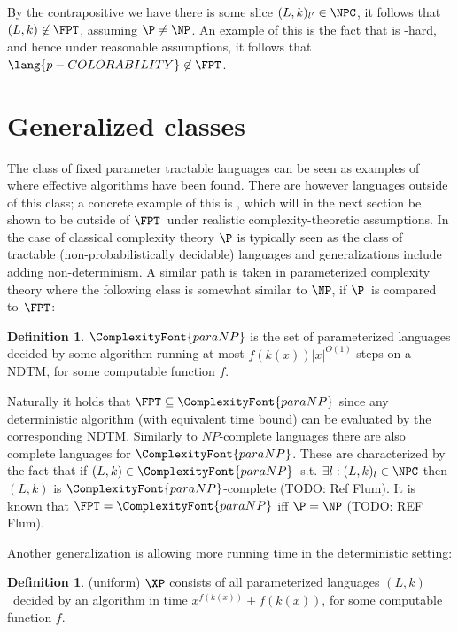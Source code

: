 \documentclass[a4paper,11pt]{report}
\theoremstyle{plain}
\theoremstyle{definition}
\newtheorem{defn}[thm]{Definition} %
\newcommand{\PARANP}{\ComplexityFont{paraNP}}
\begin{document}
By the contrapositive we have there is some slice $(L, k)_{l'} \in \NPC$, it follows that $(L, k) \not \in \FPT$, assuming $\P \not = \NP$.
An example of this is the fact that  is \NP-hard, and hence under reasonable assumptions, it follows that $\lang{p-COLORABILITY} \not \in \FPT$.

\section{Generalized classes}
The class of fixed parameter tractable languages can be seen as examples of where effective algorithms have been found.
There are however languages outside of this class; a concrete example of this is , which will in the next section be shown to be outside of $\FPT$ under realistic complexity-theoretic assumptions.
In the case of classical complexity theory $\P$ is typically seen as the class of tractable (non-probabilistically decidable) languages and generalizations include adding non-determinism.
A similar path is taken in parameterized complexity theory where the following class is somewhat similar to $\NP$, if $\P$ is compared to $\FPT$:

\begin{defn}
$\PARANP$ is the set of parameterized languages decided by some algorithm running at most $f(k(x)) |x|^{O(1)}$ steps on a NDTM, for some computable function $f$.
\end{defn}

Naturally it holds that $\FPT \subseteq \PARANP$ since any deterministic algorithm (with equivalent time bound) can be evaluated by the corresponding NDTM.
Similarly to $NP$-complete languages there are also complete languages for $\PARANP$.
These are characterized by the fact that if $(L, k) \in \PARANP$ s.t. $\exists l : (L, k)_l \in \NPC$ then $(L, k)$ is $\PARANP$-complete (TODO: Ref Flum).
It is known that $\FPT = \PARANP$ iff $\P = \NP$ (TODO: REF Flum).

Another generalization is allowing more running time in the deterministic setting:

\begin{defn}
(uniform) $\XP$ consists of all parameterized languages $(L, k)$ decided by an algorithm in time
$x^{f(k(x))} + f(k(x))$, for some computable function $f$.
\end{defn}

\end{document}

